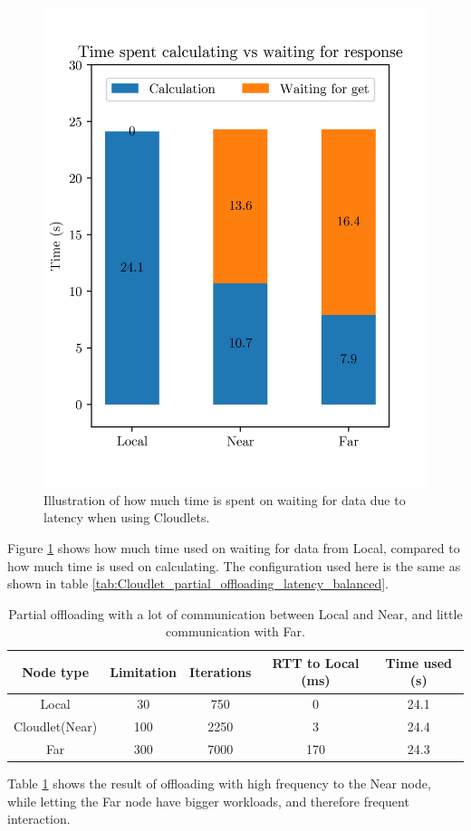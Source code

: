 \begin{figure}[t]
    \centering
    \includegraphics[scale=1]{chapters/evaluation/figures/bar_local_near_far_compare_low_interaction.png}
    \caption{Illustration of how much time is spent on waiting for data due to latency when using Cloudlets.}
    \label{fig:Cloudlet_latency_bar}
\end{figure}
Figure \ref{fig:Cloudlet_latency_bar} shows how much time used on waiting for data from Local, compared to how much time is used on calculating. The configuration used here is the same as shown in table \ref{tab:Cloudlet_partial_offloading_latency_balanced}.


\begin{table}[h!]
    \centering
    \begin{tabular}[c]{|c|c|c|c|c|}
        \hline
        Node type & Limitation & Iterations & RTT to Local (ms)& Time used (s)\\
        \hline
        \hline
        Local           & 30 & 750 & 0 & 24.1 \\
        \hline
        Cloudlet(Near)  & 100 & 2250 & 3 & 24.4 \\
        \hline
        Far             & 300 & 7000 & 170 & 24.3 \\
        \hline
    \end{tabular}
    \caption{Partial offloading with a lot of communication between Local and Near, and little communication with Far.}
    \label{tab:Cloudlet_partial_offloading_little_far}
\end{table}
Table \ref{tab:Cloudlet_partial_offloading_little_far} shows the result of offloading with high frequency to the Near node, while letting the Far node have bigger workloads, and therefore frequent interaction. 


